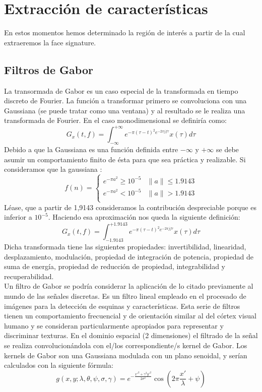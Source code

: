 \newpage

\section{Extracción de características}
En estos momentos hemos determinado la región de interés a partir de la cual extraeremos la face signature. 
\subsection{Filtros de Gabor}
La transormada de Gabor es un caso especial de la transformada en tiempo discreto de Fourier. La función a transformar primero se convoluciona con una Gaussiana (se puede tratar como una ventana) y al resultado se le realiza una transformada de Fourier. En el caso monodimensional se definiría como:\\
\[
	G_{x}(t,f)=\int_{-\infty}^{+\infty}{e^{-\pi(\tau-t)^ 2e^{-2\pi jf \tau}}x(\tau)d\tau}
\]
	Debido a que la Gaussiana es una función definida entre $-\infty$ y $+\infty$ se debe asumir un comportamiento finito de ésta para que sea práctica y realizable. Si consideramos que la gaussiana :
\[
f(n) =  
\begin{cases}
	e^{-\pi a^2}\geq 10^{-5} & \parallel a \parallel \leq 1.9143 \\
	e^{-\pi a^2} < 10^{-5} & \parallel a \parallel > 1.9143 \\
\end{cases}
\]
Léase, que a partir de 1,9143 consideramos la contribución despreciable porque es inferior a $10^{-5}$. Haciendo esa aproximación nos queda la siguiente definición:
\[
	G_{x}(t,f)=\int_{-1.9143}^{+1.9143}{e^{-\pi(\tau-t)^ 2e^{-2\pi jf \tau}}x(\tau)d\tau}
\]
Dicha transformada tiene las siguientes propiedades: invertibilidad, linearidad, desplazamiento, modulación, propiedad de integración de potencia, propiedad de suma de energía, propiedad de reducción de propiedad, integrabilidad y recuperabilidad.\\
Un filtro de Gabor \cite{Lee96imagerepresentation} se podría considerar la aplicación de lo citado previamente al mundo de las señales discretas. Es un filtro lineal empleado en el procesado de imágenes para la detección de esquinas y características. Esta serie de filtros tienen un comportamiento frecuencial y de orientación similar al del córtex visual humano y se consideran particularmente apropiados para representar y discriminar texturas. En el dominio espacial (2 dimensiones) el filtrado de la señal se realiza convolucionándola con el/los correspondiente/s kernel de Gabor. Los kernels de Gabor son una Gaussiana modulada con un plano senoidal, y serían calculados con la siguiente fórmula:
\[
g(x,y;\lambda,\theta,\psi,\sigma,\gamma)=e^{-\frac{x'^2+\gamma^2y'^2}{2\sigma^2}}\cos\left(2\pi\frac{x'}{\lambda}+\psi\right)
\]

